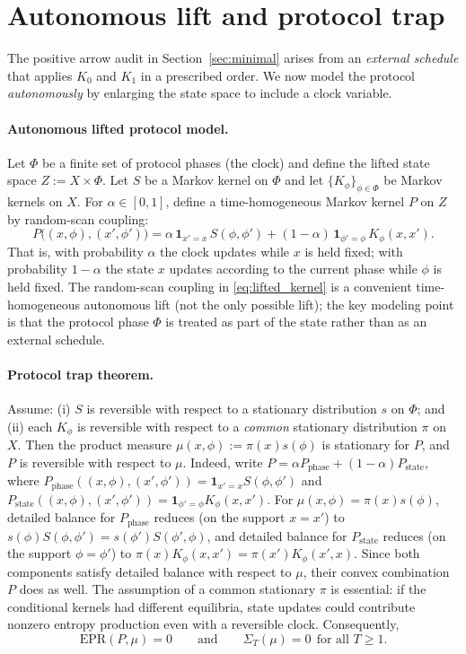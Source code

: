 \documentclass[11pt]{article}
\begin{document}
 \section{Autonomous lift and protocol trap}\label{sec:trap}

The positive arrow audit in Section~\ref{sec:minimal} arises from an \emph{external schedule} that applies \(K_0\) and \(K_1\) in a prescribed order. We now model the protocol \emph{autonomously} by enlarging the state space to include a clock variable.

\paragraph{Autonomous lifted protocol model.}
Let \(\Phi\) be a finite set of protocol phases (the clock) and define the lifted state space \(Z:=X\times\Phi\).
Let \(S\) be a Markov kernel on \(\Phi\) and let \(\{K_\phi\}_{\phi\in\Phi}\) be Markov kernels on \(X\).
For \(\alpha\in[0,1]\), define a time-homogeneous Markov kernel \(P\) on \(Z\) by random-scan coupling:
\begin{equation}\label{eq:lifted_kernel}
P\bigl((x,\phi),(x',\phi')\bigr)
=
\alpha\,\mathbf{1}_{x'=x}\,S(\phi,\phi')
+
(1-\alpha)\,\mathbf{1}_{\phi'=\phi}\,K_\phi(x,x').
\end{equation}
That is, with probability \(\alpha\) the clock updates while \(x\) is held fixed; with probability \(1-\alpha\) the state \(x\) updates according to the current phase while \(\phi\) is held fixed.
The random-scan coupling in \eqref{eq:lifted_kernel} is a convenient time-homogeneous autonomous lift (not the only possible lift); the key modeling point is that the protocol phase \(\Phi\) is treated as part of the state rather than as an external schedule.

\paragraph{Protocol trap theorem.}
Assume:
(i) \(S\) is reversible with respect to a stationary distribution \(s\) on \(\Phi\); and
(ii) each \(K_\phi\) is reversible with respect to a \emph{common} stationary distribution \(\pi\) on \(X\).
Then the product measure \(\mu(x,\phi):=\pi(x)s(\phi)\) is stationary for \(P\), and \(P\) is reversible with respect to \(\mu\).
Indeed, write \(P=\alpha P_{\mathrm{phase}}+(1-\alpha)P_{\mathrm{state}}\), where
\(P_{\mathrm{phase}}((x,\phi),(x',\phi'))=\mathbf{1}_{x'=x}S(\phi,\phi')\) and
\(P_{\mathrm{state}}((x,\phi),(x',\phi'))=\mathbf{1}_{\phi'=\phi}K_\phi(x,x')\).
For \(\mu(x,\phi)=\pi(x)s(\phi)\), detailed balance for \(P_{\mathrm{phase}}\) reduces (on the support \(x=x'\)) to \(s(\phi)S(\phi,\phi')=s(\phi')S(\phi',\phi)\), and detailed balance for \(P_{\mathrm{state}}\) reduces (on the support \(\phi=\phi'\)) to \(\pi(x)K_\phi(x,x')=\pi(x')K_\phi(x',x)\). Since both components satisfy detailed balance with respect to \(\mu\), their convex combination \(P\) does as well.
The assumption of a common stationary \(\pi\) is essential: if the conditional kernels had different equilibria, state updates could contribute nonzero entropy production even with a reversible clock.
Consequently,
\[
\mathrm{EPR}(P,\mu)=0
\qquad\text{and}\qquad
\Sigma_T(\mu)=0\ \ \text{for all }T\ge 1.
\]
\end{document}
